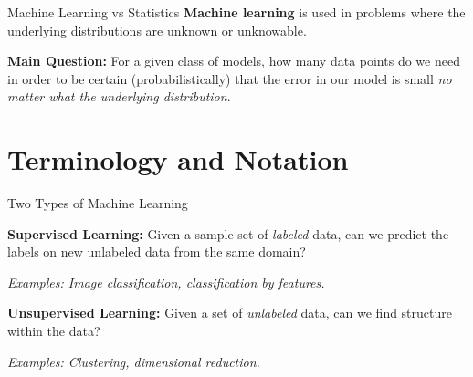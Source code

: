 \documentclass[10pt, handout]{beamer}
\begin{document}
\begin{frame}[fragile]{Machine Learning vs Statistics}
\textbf{Machine learning} is used in problems where the underlying distributions are unknown or unknowable.

\begin{center}
\end{center}

\textbf{Main Question:} For a given class of models, how many data points do we need in order to be certain (probabilistically) that the error in our model is small \textit{no matter what the underlying distribution}.
\end{frame}







\section{Terminology and Notation}




\begin{frame}[fragile]{Two Types of Machine Learning}

\textbf{Supervised Learning:} Given a sample set of \textit{labeled} data, can we predict the labels on new unlabeled data from the same domain?

\textit{Examples: Image classification, classification by features.}\vspace{3em}

\textbf{Unsupervised Learning:} Given a set of \textit{unlabeled} data, can we find structure within the data? 

\textit{Examples: Clustering, dimensional reduction.}
\end{frame}
\end{document}
